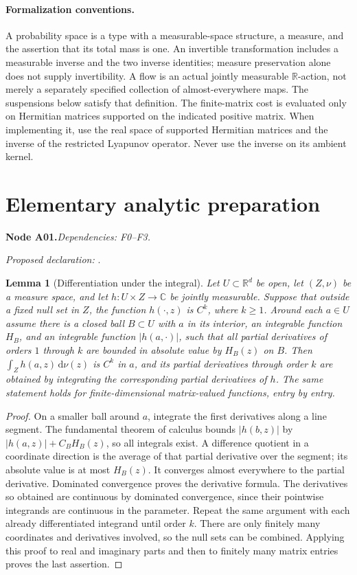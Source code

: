 \documentclass[11pt]{article}
\newtheorem{lemma}[theorem]{Lemma}
\theoremstyle{remark}\newtheorem{remark}[theorem]{Remark}
\newcommand{\R}{\mathbb R}\newcommand{\C}{\mathbb C}
\newcommand{\dd}{\,\mathrm d}\newcommand{\tr}{\operatorname{tr}}
\newcommand{\bpnode}[3]{\par\Needspace{5\baselineskip}\noindent\textbf{Node #1.}\quad\textit{Dependencies: #2.}\par\noindent\textit{Proposed declaration:} \texttt{\detokenize{#3}}.\par\smallskip}
\begin{document}
\paragraph{Formalization conventions.}
A probability space is a type with a measurable-space structure, a measure, and the assertion that its total mass is one. An invertible transformation includes a measurable inverse and the two inverse identities; measure preservation alone does not supply invertibility. A flow is an actual jointly measurable $\R$-action, not merely a separately specified collection of almost-everywhere maps. The suspensions below satisfy that definition. The finite-matrix cost is evaluated only on Hermitian matrices supported on the indicated positive matrix. When implementing it, use the real space of supported Hermitian matrices and the inverse of the restricted Lyapunov operator. Never use the inverse on its ambient kernel.

\section{Elementary analytic preparation}\label{sec:prelim}

\bpnode{A01}{F0--F3}{integral_differentiation_local_domination}
\begin{lemma}[Differentiation under the integral]\label{lem:diff-integral}
Let $U\subset\R^d$ be open, let $(Z,\nu)$ be a measure space, and let $h:U\times Z\to\C$ be jointly measurable. Suppose that outside a fixed null set in $Z$, the function $h(\cdot,z)$ is $C^k$, where $k\ge1$. Around each $a\in U$ assume there is a closed ball $B\subset U$ with $a$ in its interior, an integrable function $H_B$, and an integrable function $|h(a,\cdot)|$, such that all partial derivatives of orders $1$ through $k$ are bounded in absolute value by $H_B(z)$ on $B$. Then $\int_Zh(a,z)\dd\nu(z)$ is $C^k$ in $a$, and its partial derivatives through order $k$ are obtained by integrating the corresponding partial derivatives of $h$. The same statement holds for finite-dimensional matrix-valued functions, entry by entry.
\end{lemma}
\begin{proof}
On a smaller ball around $a$, integrate the first derivatives along a line segment. The fundamental theorem of calculus bounds $|h(b,z)|$ by $|h(a,z)|+C_BH_B(z)$, so all integrals exist. A difference quotient in a coordinate direction is the average of that partial derivative over the segment; its absolute value is at most $H_B(z)$. It converges almost everywhere to the partial derivative. Dominated convergence proves the derivative formula. The derivatives so obtained are continuous by dominated convergence, since their pointwise integrands are continuous in the parameter. Repeat the same argument with each already differentiated integrand until order $k$. There are only finitely many coordinates and derivatives involved, so the null sets can be combined. Applying this proof to real and imaginary parts and then to finitely many matrix entries proves the last assertion.
\end{proof}
\end{document}
